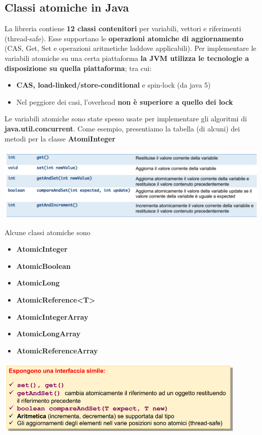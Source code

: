 \documentclass[12pt]{article}
\begin{document}
\subsection{Classi atomiche in Java}
La libreria contiene \textbf{12 classi contenitori} per variabili, vettori e riferimenti (thread-safe). Esse supportano le \textbf{operazioni atomiche di aggiornamento} (CAS, Get, Set e operazioni aritmetiche laddove applicabili). Per implementare le variabili atomiche su una certa piattaforma \textbf{la JVM utilizza le tecnologie a disposizione su quella piattaforma}; tra cui:
\begin{itemize}
    \item \textbf{CAS, load-linked/store-conditional} e spin-lock (da java 5)
    \item Nel peggiore dei casi, l'overhead \textbf{non è superiore a quello dei lock}
\end{itemize}
Le variabili atomiche sono state spesso usate per implementare gli algoritmi di \textbf{java.util.concurrent}. Come esempio, presentiamo la tabella (di alcuni) dei metodi per la classe \textbf{AtomiInteger}
\begin{center}
    \includegraphics[width = 1.10\textwidth]{Images/92.png}
\end{center}
Alcune classi atomiche sono
\begin{itemize}
    \item \textbf{AtomicInteger}
    \item \textbf{AtomicBoolean}
    \item \textbf{AtomicLong}
    \item \textbf{AtomicReference<T>}
    \item \textbf{AtomicIntegerArray}
    \item \textbf{AtomicLongArray}
    \item \textbf{AtomicReferenceArray}
\end{itemize}
\begin{center}
    \includegraphics[width = 0.90\textwidth]{Images/93.png}
\end{center}
\end{document}

